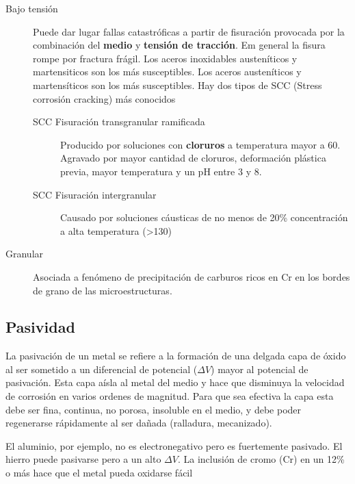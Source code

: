 \begin{description}
\begin{description}
		      \item[Bajo tensión] Puede dar lugar  fallas catastróficas a partir de fisuración provocada por la combinación del \textbf{medio} y \textbf{tensión de tracción}. Em general la fisura rompe por fractura frágil. Los aceros inoxidables austeníticos y martensiticos son los más susceptibles. Los aceros austeníticos y martensíticos son los más susceptibles. Hay dos tipos de SCC (Stress  corrosión cracking) más conocidos
		      \begin{description}
				  \item[SCC Fisuración transgranular ramificada] Producido por soluciones con \textbf{cloruros} a temperatura mayor a 60\grad. Agravado por mayor cantidad de cloruros, deformación plástica previa, mayor temperatura y un pH entre 3 y 8.
				  \item[SCC Fisuración intergranular] Causado por soluciones cáusticas de no menos de 20\% concentración a alta temperatura (>130\grad)
			  \end{description}
		      \item[Granular] Asociada a fenómeno de precipitación de carburos ricos en Cr en los bordes de grano de las microestructuras.
	      \end{description}
\end{description}


\subsection{Pasividad}
La pasivación de un metal se refiere a la formación de una delgada capa de óxido al ser sometido a un diferencial de potencial ($\Delta V$) mayor al potencial de pasivación. Esta capa aísla al metal del medio y hace que disminuya la velocidad de corrosión en varios ordenes de magnitud. Para que sea efectiva la capa esta debe ser fina, continua, no porosa, insoluble en el medio, y debe poder regenerarse rápidamente al ser dañada (ralladura, mecanizado). 

El aluminio, por ejemplo, no es electronegativo pero es fuertemente pasivado. El hierro puede pasivarse pero a un alto $\Delta V$. La inclusión de cromo (Cr) en un 12\% o más hace que el metal pueda oxidarse fácil

